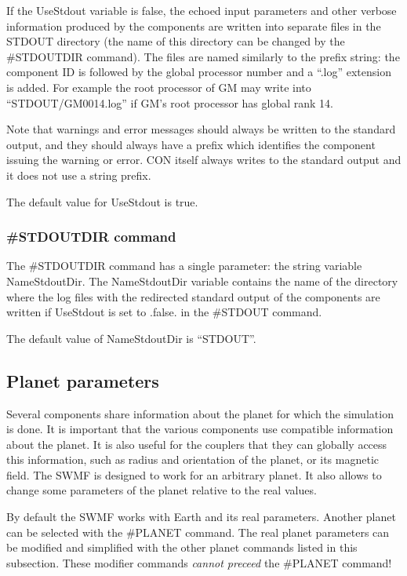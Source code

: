If the UseStdout variable is false, the echoed input parameters and other
verbose information produced by the components are written 
into separate files in the STDOUT directory (the name of
this directory can be changed by the \#STDOUTDIR command). 
The files are named similarly to the prefix string: 
the component ID is followed by the global processor number
and a ``.log'' extension is added. For example the root processor
of GM may write into ``STDOUT/GM0014.log'' if GM's root processor 
has global rank 14.

Note that warnings and error messages should always be written to
the standard output, and they should always have a prefix which
identifies the component issuing the warning or error.
CON itself always writes to the standard output and it does not
use a string prefix.

The default value for UseStdout is true.

\subsubsection{\#STDOUTDIR command}

The \#STDOUTDIR command has a single parameter: the string variable
NameStdoutDir. The NameStdoutDir variable contains the name of the
directory where the log files with the redirected standard output
of the components are written if UseStdout is set to .false. in
the \#STDOUT command. 

The default value of NameStdoutDir is ``STDOUT''.

\subsection{Planet parameters}

Several components share information about the planet for which the
simulation is done. It is important that the various components
use compatible information about the planet. It is also useful
for the couplers that they can globally access this information,
such as radius and orientation of the planet, or its magnetic
field. The SWMF is designed to work for an arbitrary planet.
It also allows to change some parameters of the planet relative
to the real values.

By default the SWMF works with Earth and its real parameters.
Another planet can be selected with the \#PLANET command.
The real planet parameters can be modified and simplified
with the other planet commands listed in this subsection.
These modifier commands {\it cannot preceed} the \#PLANET command!

